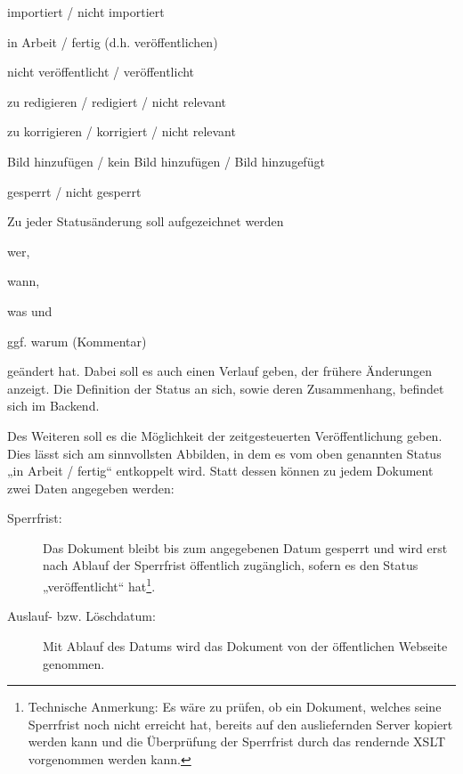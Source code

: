 \begin{compactitem}
  \item importiert / nicht importiert
  \item in Arbeit / fertig (d.h. veröffentlichen)
  \item nicht veröffentlicht / veröffentlicht
  \item zu redigieren / redigiert / nicht relevant
  \item zu korrigieren / korrigiert / nicht relevant
  \item Bild hinzufügen / kein Bild hinzufügen / Bild hinzugefügt
  \item gesperrt / nicht gesperrt
\end{compactitem}


Zu jeder Statusänderung soll aufgezeichnet werden

\begin{compactitem}
  \item wer,
  \item wann,
  \item was und
  \item ggf. warum (Kommentar)
\end{compactitem}

geändert hat. Dabei soll es auch einen Verlauf geben, der frühere Änderungen
anzeigt.  Die Definition der Status an sich, sowie deren Zusammenhang,
befindet sich im Backend.

Des Weiteren soll es die Möglichkeit der zeitgesteuerten Veröffentlichung
geben. Dies lässt sich am sinnvollsten Abbilden, in dem es vom oben genannten
Status „in Arbeit / fertig“ entkoppelt wird. Statt dessen können zu jedem
Dokument zwei Daten angegeben werden:

\begin{description}

  \item[Sperrfrist:] Das Dokument bleibt bis zum angegebenen Datum gesperrt
    und wird erst nach Ablauf der Sperrfrist öffentlich zugänglich, sofern es 
    den Status „veröffentlicht“ hat\footnote{Technische Anmerkung: Es wäre zu
    prüfen, ob ein Dokument, welches seine Sperrfrist noch nicht erreicht hat,
    bereits auf den ausliefernden Server kopiert werden kann und die
    Überprüfung der Sperrfrist durch das rendernde XSLT vorgenommen werden
    kann.}.

  \item[Auslauf- bzw. Löschdatum:] Mit Ablauf des Datums wird das Dokument
    von der öffentlichen Webseite genommen.

\end{description}


